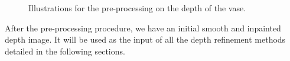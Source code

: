 \begin{figure}[!htbp]
\centering
{}
\caption{Illustrations for the pre-processing on the depth of the vase.}
\label{fig:pre-processing}
\end{figure}

After the pre-processing procedure, we have an initial smooth and inpainted depth image. 
It will be used as the input of all the depth refinement methods detailed in the following sections.

